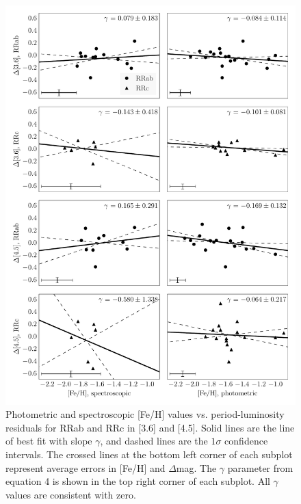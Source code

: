 \documentclass[a4paper,fleqn,usenatbib]{mnras}
\begin{document}
\begin{figure}
\begin{center}
\includegraphics[width=160mm]{reworked_fitting_code/final_plots/metallicity_vs_residuals_m4_split.pdf}
\caption{Photometric \citep{2000AJ....119.1824R} and spectroscopic \citep{2006ApJ...640L..43S} [Fe/H] values vs. period-luminosity residuals for RRab and RRc in [3.6] and [4.5]. Solid lines are the line of best fit with slope $\gamma$, and dashed lines are the $1\sigma$ confidence intervals. The crossed lines at the bottom left corner of each subplot represent average errors in [Fe/H] and $\Delta$mag. The $\gamma$ parameter from equation 4 is shown in the top right corner of each subplot. All $\gamma$ values are consistent with zero.}
\label{fig:metallicity_residuals}
\end{center}
\end{figure}


\end{document}
